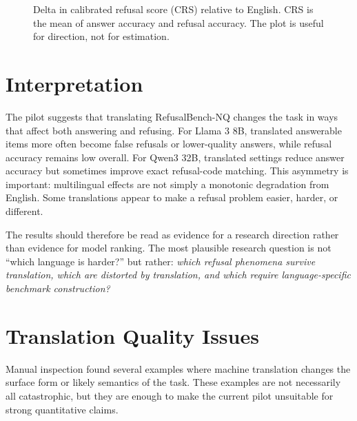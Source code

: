 \documentclass[11pt]{article}
\begin{document}
\begin{figure}[ht]
\centering
{}
\caption{Delta in calibrated refusal score (CRS) relative to English. CRS is the
mean of answer accuracy and refusal accuracy. The plot is useful for direction,
not for estimation.}
\label{fig:crs-delta}
\end{figure}

\section{Interpretation}

The pilot suggests that translating RefusalBench-NQ changes the task in ways
that affect both answering and refusing. For Llama 3 8B, translated answerable
items more often become false refusals or lower-quality answers, while refusal
accuracy remains low overall. For Qwen3 32B, translated settings reduce answer
accuracy but sometimes improve exact refusal-code matching. This asymmetry is
important: multilingual effects are not simply a monotonic degradation from
English. Some translations appear to make a refusal problem easier, harder, or
different.

The results should therefore be read as evidence for a research direction rather
than evidence for model ranking. The most plausible research question is not
``which language is harder?'' but rather: \emph{which refusal phenomena survive
translation, which are distorted by translation, and which require
language-specific benchmark construction?}

\section{Translation Quality Issues}

Manual inspection found several examples where machine translation changes the
surface form or likely semantics of the task. These examples are not necessarily
all catastrophic, but they are enough to make the current pilot unsuitable for
strong quantitative claims.
\end{document}
